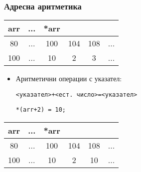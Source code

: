 \documentclass{beamer}
\begin{document}
\begin{frame}[fragile]
\frametitle{Адресна аритметика}


\begin{tabular} {c | c | c | c | c | c }

arr &... &*arr \\\hline
80  &... & 100 & 104 & 108 &... \\\hline
100 &... & 10   & 2   & 3   &... \\\hline
  
\end{tabular}


\begin{itemize}
  \item Аритметични операции с указател:   

\texttt{<указател>+<ест. число>=<указател>}
\begin{flushleft}
\begin{lstlisting}
*(arr+2) = 10;
\end{lstlisting}
\end{flushleft}

\end{itemize}

\pause
\begin{tabular} {c | c | c | c | c | c }

arr &... &*arr \\\hline
80  &... & 100 & 104 & 108 &... \\\hline
100 &... & 10   & 2   & \alert{10}   &... \\\hline
  
\end{tabular}

\end{frame}
\end{document}

